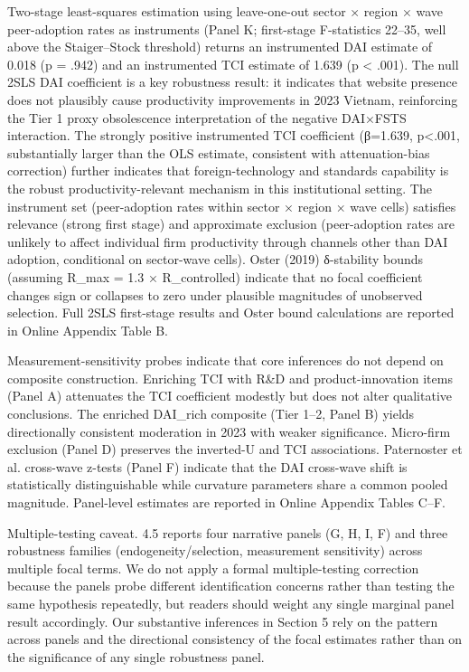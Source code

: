 \documentclass[12pt,a4paper]{article}
\begin{document}
Two-stage least-squares estimation using leave-one-out sector × region ×
wave peer-adoption rates as instruments (Panel K; first-stage
F-statistics 22--35, well above the Staiger--Stock threshold) returns an
instrumented DAI estimate of 0.018 (p = .942) and an instrumented TCI
estimate of 1.639 (p \textless{} .001). The null 2SLS DAI coefficient is
a key robustness result: it indicates that website presence does not
plausibly cause productivity improvements in 2023 Vietnam, reinforcing
the Tier 1 proxy obsolescence interpretation of the negative DAI×FSTS
interaction. The strongly positive instrumented TCI coefficient
(β=1.639, p\textless.001, substantially larger than the OLS estimate,
consistent with attenuation-bias correction) further indicates that
foreign-technology and standards capability is the robust
productivity-relevant mechanism in this institutional setting. The
instrument set (peer-adoption rates within sector × region × wave cells)
satisfies relevance (strong first stage) and approximate exclusion
(peer-adoption rates are unlikely to affect individual firm productivity
through channels other than DAI adoption, conditional on sector-wave
cells). Oster (2019) δ-stability bounds (assuming R\_max = 1.3 ×
R\_controlled) indicate that no focal coefficient changes sign or
collapses to zero under plausible magnitudes of unobserved selection.
Full 2SLS first-stage results and Oster bound calculations are reported
in Online Appendix Table B.

Measurement-sensitivity probes indicate that core inferences do not
depend on composite construction. Enriching TCI with R\&D and
product-innovation items (Panel A) attenuates the TCI coefficient
modestly but does not alter qualitative conclusions. The enriched
DAI\_rich composite (Tier 1--2, Panel B) yields directionally consistent
moderation in 2023 with weaker significance. Micro-firm exclusion (Panel
D) preserves the inverted-U and TCI associations. Paternoster et al.
cross-wave z-tests (Panel F) indicate that the DAI cross-wave shift is
statistically distinguishable while curvature parameters share a common
pooled magnitude. Panel-level estimates are reported in Online Appendix
Tables C--F.

Multiple-testing caveat. 4.5 reports four narrative panels (G, H, I, F)
and three robustness families (endogeneity/selection, measurement
sensitivity) across multiple focal terms. We do not apply a formal
multiple-testing correction because the panels probe different
identification concerns rather than testing the same hypothesis
repeatedly, but readers should weight any single marginal panel result
accordingly. Our substantive inferences in Section 5 rely on the pattern
across panels and the directional consistency of the focal estimates
rather than on the significance of any single robustness panel.
\end{document}
